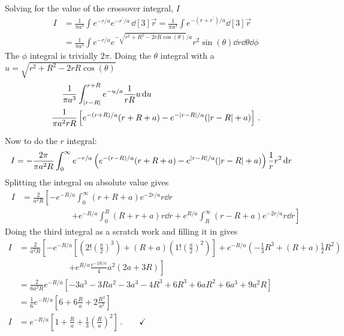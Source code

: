\documentclass[11pt]{article}
\begin{document}
Solving for the value of the crossover integral, $I$
\begin{align*}
I & = \frac{1}{\pi a^3}\int e^{-r/a}e^{-r^\prime /a} \, \dd[3]{\vec{r}} = \frac{1}{\pi a^3}\int e^{-(r+r^\prime)/a}\dd[3]{\vec{r}}\\
& = \frac{1}{\pi a^3} \int e^{-r/a}e^{-\sqrt{r^2 + R^2 - 2rR \cos(\theta)}/a}r^2 \sin(\theta)\dd{r}\dd{\theta}\dd{\phi}
\end{align*}
The $\phi$ integral is trivially $2\pi$. Doing the $\theta$ integral with a $\displaystyle{u = \sqrt{r^2 + R^2 - 2rR \cos(\theta)}}$
\begin{align*}
\frac{1}{\pi a^3} & \int_\abs{r-R}^{r+R} e^{-u/a} \frac{1}{rR} u \dd{u}\\
\frac{1}{\pi a^2 rR} & \left[e^{-(r+R)/a}(r+R+a) - e^{-\abs{r-R}/a}(\abs{r-R} + a)\right] \, .
\end{align*}

Now to do the $r$ integral:
\begin{align*}
I & = -\frac{2 \pi}{\pi a^2 R} \int_0^\infty e^{-r/a} \left(e^{-(r-R)/a}(r+R+a) - e^{\abs{r-R}/a}(\abs{r-R} + a)\right)\frac{1}{r}r^2\dd{r}
\end{align*}
Splitting the integral on absolute value gives
\begin{align*}
I& = \frac{2}{a^2 R} \left[-e^{-R/a}\int_0^\infty (r+R+a)e^{-2r/a} r\dd{r} \right.\\
& \hspace{6em} \left.+ e^{-R/a}\int_0^R (R+r+a)r\dd{r} + e^{R/a}\int_R^\infty (r-R+a)e^{-2r/a}r\dd{r}\right]
\end{align*}
Doing the third integral as a scratch work and filling it in gives
\begin{align*}
I & = \frac{2}{a^2 R}\left[-e^{-R/a}\left[\left(2! \left(\frac{a}{2}\right)^3\right) + (R+a)\left( 1! \left(\frac{a}{2}\right)^2\right)\right] + e^{-R/a}\left(-\frac{1}{3}R^3 + (R+a)\frac{1}{2}R^2\right) \right.\\
& \hspace{6em}\left. + e^{R/a}\frac{e^{-2R/a}}{4}a^2(2a+3R)\right]\\
& = \frac{2}{6a^2 R}e^{-R/a}\left[-3a^3 - 3Ra^2 - 3a^3 - 4R^3 + 6R^3 + 6aR^2 + 6a^3 + 9a^2R\right]\\
& = \frac{1}{6} e^{-R/a}\left[6 + 6\frac{R}{a} + 2\frac{R^2}{a^2}\right]\\
I & = e^{-R/a}\left[1 + \frac{R}{a} + \frac{1}{3}\left(\frac{R}{a}\right)^2\right] \, . \qquad \checkmark
\end{align*}
\end{document}

